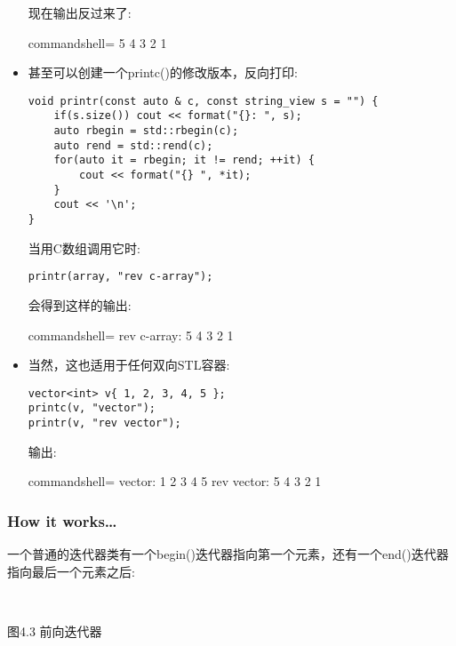 \begin{itemize}
现在输出反过来了:

\begin{tcblisting}{commandshell={}}
5 4 3 2 1
\end{tcblisting}

\item 
甚至可以创建一个printc()的修改版本，反向打印:

\begin{lstlisting}[style=styleCXX]
void printr(const auto & c, const string_view s = "") {
	if(s.size()) cout << format("{}: ", s);
	auto rbegin = std::rbegin(c);
	auto rend = std::rend(c);
	for(auto it = rbegin; it != rend; ++it) {
		cout << format("{} ", *it);
	}
	cout << '\n';
}
\end{lstlisting}

当用C数组调用它时:

\begin{lstlisting}[style=styleCXX]
printr(array, "rev c-array");
\end{lstlisting}

会得到这样的输出:

\begin{tcblisting}{commandshell={}}
rev c-array: 5 4 3 2 1
\end{tcblisting}

\item 
当然，这也适用于任何双向STL容器:

\begin{lstlisting}[style=styleCXX]
vector<int> v{ 1, 2, 3, 4, 5 };
printc(v, "vector");
printr(v, "rev vector");
\end{lstlisting}

输出:

\begin{tcblisting}{commandshell={}}
vector: 1 2 3 4 5
rev vector: 5 4 3 2 1
\end{tcblisting}
\end{itemize}


\subsubsection{How it works…}

一个普通的迭代器类有一个begin()迭代器指向第一个元素，还有一个end()迭代器指向最后一个元素之后:

\hspace*{\fill} \\ %
\begin{center}

图4.3 前向迭代器
\end{center}

